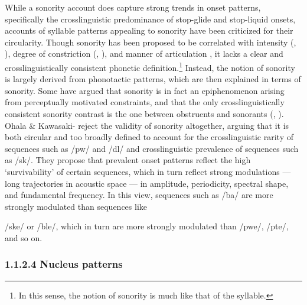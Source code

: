  While a sonority account does capture strong trends in onset patterns, specifically the crosslinguistic predominance of stop-glide and stop-liquid onsets, accounts of syllable patterns appealing to sonority have been criticized for their circularity. Though sonority has been proposed to be correlated with intensity (\citealt{Gordon2002}, \citealt{Parker2002}), degree of constriction (\citealt{Chin1996}, \citealt{Cser2003}), and manner of articulation \citep{Parker2011}, it lacks a clear and crosslinguistically consistent phonetic definition.\footnote{ \textrm{In this sense, the notion of sonority is much like that of the syllable.}} Instead, the notion of sonority is largely derived from phonotactic patterns, which are then explained in terms of sonority. Some have argued that sonority is in fact an epiphenomenon arising from perceptually motivated constraints, and that the only crosslinguistically consistent sonority contrast is the one between obstruents and sonorants (\citealt{JanyEtAl2007}, \citealt{HenkeEtAl2012}). Ohala \& Kawasaki-\citet{Fukumori1997} reject the validity of sonority altogether, arguing that it is both circular and too broadly defined to account for the crosslinguistic rarity of sequences such as /pw/ and /dl/ and crosslinguistic prevalence of sequences such as /sk/. They propose that prevalent onset patterns reflect the high ‘survivability’ of certain sequences, which in turn reflect strong modulations — long trajectories in acoustic space —  in amplitude, periodicity, spectral shape, and fundamental frequency. In this view, sequences such as /ba/ are more strongly modulated than sequences like 

/ske/ or /ble/, which in turn are more strongly modulated than /pwe/, /pte/, and so on.

\subsubsection{\textbf{1.1.2.4} \textbf{Nucleus} \textbf{patterns}}

